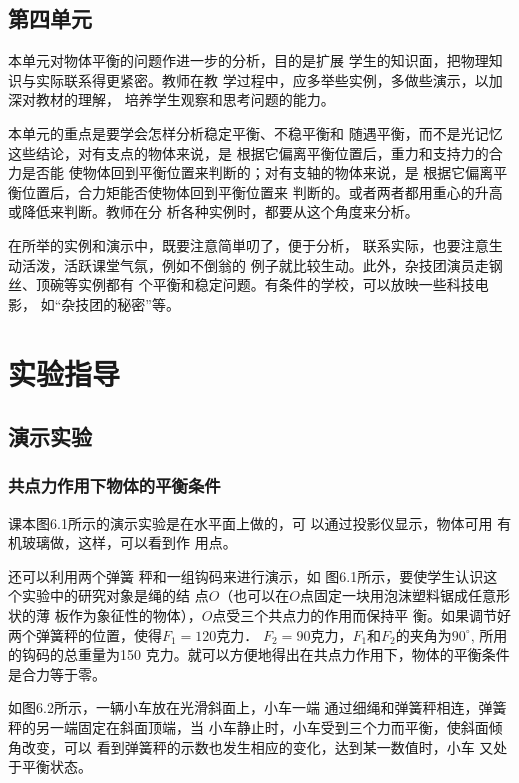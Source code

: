 \subsection{第四单元}
本单元对物体平衡的问题作进一步的分析，目的是扩展
学生的知识面，把物理知识与实际联系得更紧密。教师在教
学过程中，应多举些实例，多做些演示，以加深对教材的理解，
培养学生观察和思考问题的能力。

本单元的重点是要学会怎样分析稳定平衡、不稳平衡和
随遇平衡，而不是光记忆这些结论，对有支点的物体来说，是
根据它偏离平衡位置后，重力和支持力的合力是否能
使物体回到平衡位置来判断的；对有支轴的物体来说，是
根据它偏离平衡位置后，合力矩能否使物体回到平衡位置来
判断的。或者两者都用重心的升高或降低来判断。教师在分
析各种实例时，都要从这个角度来分析。

在所举的实例和演示中，既要注意简単叨了，便于分析，
联系实际，也要注意生动活泼，活跃课堂气氛，例如不倒翁的
例子就比较生动。此外，杂技团演员走钢丝、顶碗等实例都有
个平衡和稳定问题。有条件的学校，可以放映一些科技电影，
如“杂技团的秘密”等。

\section{实验指导}
\subsection{演示实验}
\subsubsection{共点力作用下物体的平衡条件}
课本图6.1所示的演示实验是在水平面上做的，可
以通过投影仪显示，物体可用
有机玻璃做，这样，可以看到作
用点。

\begin{figure}[htp]
    \centering
    \caption{}
\end{figure}

还可以利用两个弹簧
秤和一组钩码来进行演示，如
图6.1所示，要使学生认识这
个实验中的研究对象是绳的结
点$O$（也可以在$O$点固定一块用泡沫塑料锯成任意形状的薄
板作为象征性的物体），$O$点受三个共点力的作用而保持平
衡。如果调节好两个弹簧秤的位置，使得$F_1=120$克力．
$F_2=90$克力，$F_1$和$F_2$的夹角为$90^{\circ}$, 所用的钩码的总重量为150
克力。就可以方便地得出在共点力作用下，物体的平衡条件
是合力等于零。

如图6.2所示，一辆小车放在光滑斜面上，小车一端
通过细绳和弹簧秤相连，弹簧秤的另一端固定在斜面顶端，当
小车静止时，小车受到三个力而平衡，使斜面倾角改变，可以
看到弹簧秤的示数也发生相应的变化，达到某一数值时，小车
又处于平衡状态。

